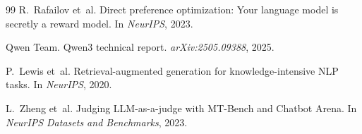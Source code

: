 \documentclass[10pt,a4paper]{article}
\begin{document}
\begin{thebibliography}{99}
R.~Rafailov et~al. Direct preference optimization: Your language model is secretly a reward model.
In \emph{NeurIPS}, 2023.

Qwen Team. Qwen3 technical report. \emph{arXiv:2505.09388}, 2025.

P.~Lewis et~al. Retrieval-augmented generation for knowledge-intensive NLP tasks. In \emph{NeurIPS}, 2020.

L.~Zheng et~al. Judging LLM-as-a-judge with MT-Bench and Chatbot Arena. In \emph{NeurIPS Datasets and
Benchmarks}, 2023.

\end{thebibliography}
\end{document}
